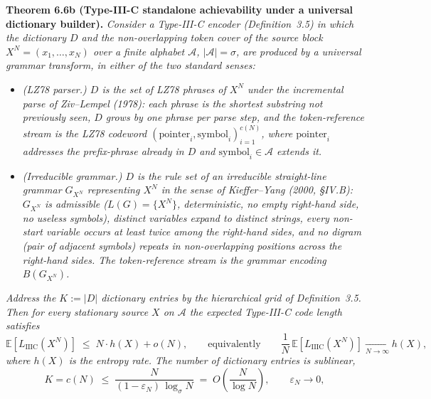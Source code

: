 \documentclass[
]{article}
\begin{document}
\textbf{Theorem 6.6b (Type-III-C standalone achievability under a
universal dictionary builder).} \emph{Consider a Type-III-C encoder
(Definition~3.5) in which the dictionary $D$ and the non-overlapping
token cover of the source block $X^N = (x_1,\ldots,x_N)$ over a finite
alphabet $\mathcal{A}$, $|\mathcal{A}| = \sigma$, are produced by a
\emph{universal grammar transform}, in either of the two standard
senses:}
\begin{itemize}
\item[(i)] \emph{(LZ78 parser.) $D$ is the set of LZ78 phrases of
$X^N$ under the incremental parse of Ziv--Lempel (1978): each phrase
is the shortest substring not previously seen, $D$ grows by one phrase
per parse step, and the token-reference stream is the LZ78 codeword
$(\mathrm{pointer}_i, \mathrm{symbol}_i)_{i=1}^{c(N)}$, where
$\mathrm{pointer}_i$ addresses the prefix-phrase already in $D$ and
$\mathrm{symbol}_i \in \mathcal{A}$ extends it.}
\item[(ii)] \emph{(Irreducible grammar.) $D$ is the rule set of an
\emph{irreducible} straight-line grammar $G_{X^N}$ representing $X^N$
in the sense of Kieffer--Yang (2000, \S IV.B): $G_{X^N}$ is admissible
($L(G) = \{X^N\}$, deterministic, no empty right-hand side, no useless
symbols), distinct variables expand to distinct strings, every
non-start variable occurs at least twice among the right-hand sides,
and no digram (pair of adjacent symbols) repeats in non-overlapping
positions across the right-hand sides. The token-reference stream is
the grammar encoding $B(G_{X^N})$.}
\end{itemize}
\emph{Address the $K := |D|$ dictionary entries by the hierarchical
grid of Definition~3.5. Then for every \emph{stationary} source $X$ on
$\mathcal{A}$ the expected Type-III-C code length satisfies}
\[
\mathbb{E}\!\left[L_{\mathrm{IIIC}}(X^N)\right] \;\le\; N \cdot h(X) + o(N),
\qquad\text{equivalently}\qquad
\frac{1}{N}\,\mathbb{E}\!\left[L_{\mathrm{IIIC}}(X^N)\right] \xrightarrow[N\to\infty]{} h(X),
\tag{6.6}
\]
\emph{where $h(X)$ is the entropy rate. The number of dictionary
entries is sublinear,}
\[
K = c(N) \;\le\; \frac{N}{(1-\varepsilon_N)\,\log_\sigma N} \;=\; O\!\left(\frac{N}{\log N}\right),
\qquad \varepsilon_N \to 0,
\tag{6.7}
\]
\end{document}

